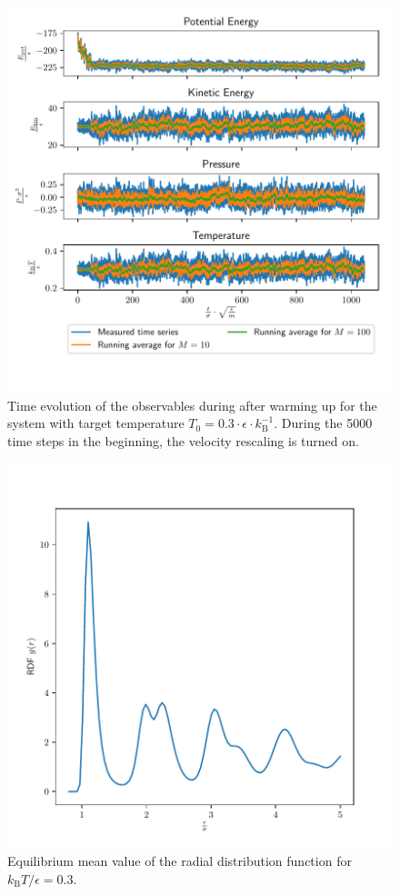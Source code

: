\documentclass[a4paper,10pt,bibtotoc]{scrartcl}
\begin{document}
\begin{figure}
        \centering
        \includegraphics[width=\linewidth]{equi03.pdf}
    \caption{Time evolution of the observables during after warming up for the system with target temperature $T_0 = 0.3\cdot \epsilon\cdot k_\mathrm{B}^{-1}$. During the 5000 time steps in the beginning, the velocity rescaling is turned on.}
    \label{fig:figx0}
\end{figure}
\begin{figure}
        \centering
        \includegraphics[width=\linewidth]{rdf03.pdf}
    \caption{Equilibrium mean value of the radial distribution function for $k_\mathrm{B}T/\epsilon=0.3$.}
    \label{fig:figx1}
\end{figure}
\end{document}
